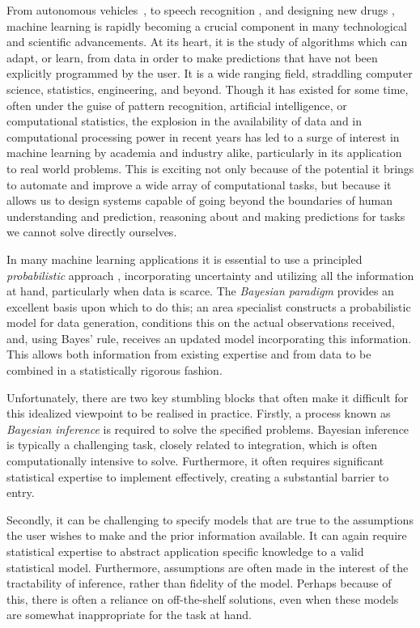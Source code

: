 
From autonomous vehicles~\citep{lefevre2014survey}, to speech recognition \citep{jurafsky2014speech},
and designing new drugs \citep{burbidge2001drug}, machine learning is rapidly becoming a 
crucial component in many technological and scientific advancements.  
At its heart, it is the study of algorithms which can adapt, or learn, from data in order
to make predictions that have not been explicitly programmed by the user.  It is a wide ranging field,
straddling computer science, statistics, engineering, and beyond. Though it has existed for some
time, often under the guise of pattern recognition, artificial intelligence, or computational 
statistics, the explosion in the availability of data and in computational processing power in recent
years has led to a surge of interest in machine learning by academia and industry alike, particularly 
in its application to real world problems.  This is exciting not only because of the potential it brings
to automate and improve a wide array of computational tasks, but because it allows us to design 
systems capable of going beyond the boundaries of human understanding and prediction, reasoning
about and making predictions for tasks we cannot solve directly ourselves.

In many machine learning applications it is essential to use a principled \emph{probabilistic} 
approach \cite{ghahramani2015probabilistic}, incorporating uncertainty and utilizing all the information at hand, 
particularly when data is scarce.  The \emph{Bayesian paradigm} provides an excellent basis upon which to do this; an area 
specialist constructs a probabilistic model for data generation, conditions this on the actual observations received, 
and, using Bayes' rule, receives an updated model incorporating this information.  This
allows both information from existing expertise and from data to be combined in a statistically
rigorous fashion.

Unfortunately, there are two key stumbling blocks that often make it difficult for this idealized
viewpoint to be realised in practice.  Firstly, a process known as \emph{Bayesian inference} is
required to solve the specified problems.  Bayesian inference is typically a challenging task, closely 
related to integration, which is often computationally intensive to solve.  Furthermore, it often
requires significant statistical expertise to implement effectively, creating a substantial barrier to
entry.  

Secondly, it can be challenging to specify models that are true to the assumptions the user
wishes to make and the prior information available.  It can again require statistical expertise to abstract
application specific knowledge to a valid statistical model.  Furthermore, assumptions are often made in the interest
of the tractability of inference, rather than fidelity of the model.  Perhaps because of this, there is often
a reliance on off-the-shelf solutions, even when these models are somewhat inappropriate for the task
at hand.

